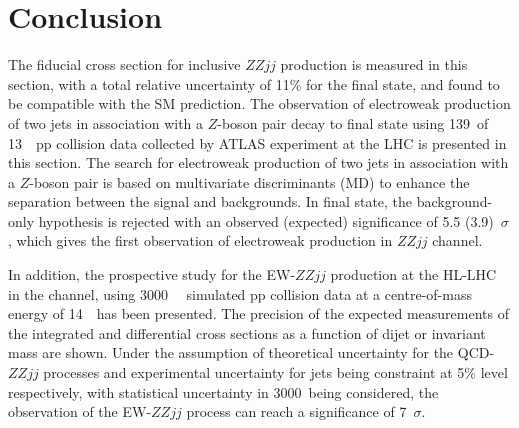 \section{Conclusion}

The fiducial cross section for inclusive $ZZjj$ production is measured in this section, with a total relative uncertainty of 11\% for the \llll final state,
and found to be compatible with the SM prediction.
The observation of electroweak production of two jets in association with a $Z$-boson pair decay to \llll final state 
using 139~\ifb of 13~\tev~pp collision data collected by ATLAS experiment at the LHC is presented in this section.
The search for electroweak production of two jets in association with a $Z$-boson pair is based on multivariate discriminants (MD) to enhance the separation between the signal and backgrounds.
In \llll final state, the background-only hypothesis is rejected with an observed (expected) significance of 5.5 (3.9)~$\sigma$,
which gives the first observation of electroweak production in $ZZjj$ channel.

In addition, the prospective study for the EW-$ZZjj$ production at the HL-LHC in the \llll channel, using 3000~\ifb~ simulated pp collision data at a centre-of-mass energy of 14~\tev~has been presented.
The precision of the expected measurements of the integrated and differential cross sections as a function of dijet or \llll invariant mass are shown.
Under the assumption of theoretical uncertainty for the QCD-$ZZjj$ processes 
and experimental uncertainty for jets being constraint at 5\% level respectively, 
with statistical uncertainty in 3000~\ifb being considered, 
the observation of the EW-$ZZjj$ process can reach a significance of 7~$\sigma$.
